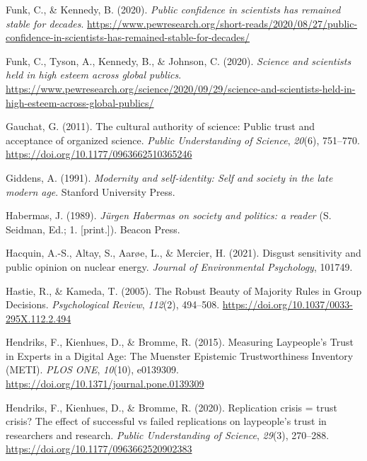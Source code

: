 \documentclass[
  man,
  floatsintext,
  longtable,
  nolmodern,
  notxfonts,
  notimes,
  colorlinks=true,linkcolor=blue,citecolor=blue,urlcolor=blue]{apa7}
\newlength{\cslhangindent}
\newenvironment{CSLReferences}[2] %
 {\begin{list}{}{%
  \setlength{\itemindent}{0pt}
  \setlength{\leftmargin}{0pt}
  \setlength{\parsep}{0pt}
  \ifodd #1
   \setlength{\leftmargin}{\cslhangindent}
   \setlength{\itemindent}{-1\cslhangindent}
  \fi
  \setlength{\itemsep}{#2\baselineskip}}}
 {\end{list}}
\begin{document}
\begin{CSLReferences}{1}{0}
Funk, C., \& Kennedy, B. (2020). \emph{Public confidence in scientists
has remained stable for decades}.
\url{https://www.pewresearch.org/short-reads/2020/08/27/public-confidence-in-scientists-has-remained-stable-for-decades/}

Funk, C., Tyson, A., Kennedy, B., \& Johnson, C. (2020). \emph{Science
and scientists held in high esteem across global publics}.
\url{https://www.pewresearch.org/science/2020/09/29/science-and-scientists-held-in-high-esteem-across-global-publics/}

Gauchat, G. (2011). The cultural authority of science: Public trust and
acceptance of organized science. \emph{Public Understanding of Science},
\emph{20}(6), 751--770. \url{https://doi.org/10.1177/0963662510365246}

Giddens, A. (1991). \emph{Modernity and self-identity: Self and society
in the late modern age}. Stanford University Press.

Habermas, J. (1989). \emph{Jürgen Habermas on society and politics: a
reader} (S. Seidman, Ed.; 1. {[}print.{]}). Beacon Press.

Hacquin, A.-S., Altay, S., Aarøe, L., \& Mercier, H. (2021). Disgust
sensitivity and public opinion on nuclear energy. \emph{Journal of
Environmental Psychology}, 101749.

Hastie, R., \& Kameda, T. (2005). The Robust Beauty of Majority Rules in
Group Decisions. \emph{Psychological Review}, \emph{112}(2), 494--508.
\url{https://doi.org/10.1037/0033-295X.112.2.494}

Hendriks, F., Kienhues, D., \& Bromme, R. (2015). Measuring
Laypeople{'}s Trust in Experts in a Digital Age: The Muenster Epistemic
Trustworthiness Inventory (METI). \emph{PLOS ONE}, \emph{10}(10),
e0139309. \url{https://doi.org/10.1371/journal.pone.0139309}

Hendriks, F., Kienhues, D., \& Bromme, R. (2020). Replication crisis =
trust crisis? The effect of successful vs failed replications on
laypeople{'}s trust in researchers and research. \emph{Public
Understanding of Science}, \emph{29}(3), 270--288.
\url{https://doi.org/10.1177/0963662520902383}


\end{CSLReferences}
\end{document}
